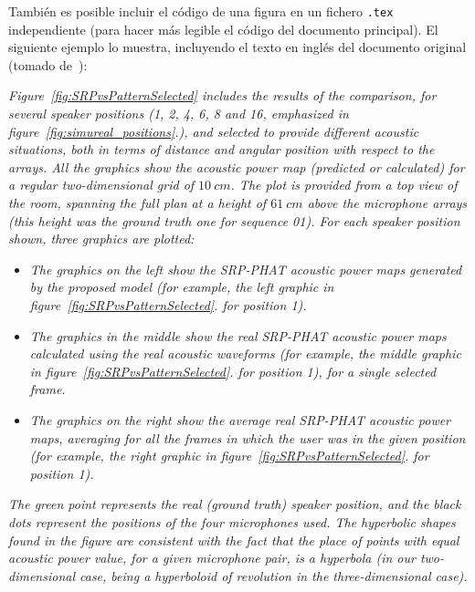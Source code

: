 También es posible incluir el código de una figura en un fichero \texttt{.tex} independiente (para hacer más legible el código del documento principal). El siguiente ejemplo lo muestra, incluyendo el texto en inglés del documento original (tomado de~\cite{velasco2016generative}):

\emph{Figure~\ref{fig:SRPvsPatternSelected} includes the results of the comparison, for several speaker positions (1, 2, 4, 6, 8 and 16, emphasized in figure~\ref{fig:simureal_positions}.), and selected to provide different acoustic situations, both in terms of distance and angular position with respect to the arrays. All the graphics show the acoustic power map (predicted or calculated) for a regular two-dimensional grid of $10~cm$. The plot is provided from a top view of the room, spanning the full plan at a height of $61~cm$ above the microphone arrays (this height was the ground truth one for sequence 01). For each speaker position shown, three graphics are plotted:}

\begin{itemize}
  \item \emph{The graphics on the left show the SRP-PHAT acoustic power maps generated by the proposed model (for example, the left graphic in figure~\ref{fig:SRPvsPatternSelected}. for position 1).}
  \item \emph{The graphics in the middle show the real SRP-PHAT acoustic power maps calculated using the real acoustic waveforms (for example, the middle graphic in figure~\ref{fig:SRPvsPatternSelected}. for position 1), for a single selected frame.}
  \item \emph{The graphics on the right show the average real SRP-PHAT acoustic power maps, averaging for all the frames in which the user was in the given position (for example, the right graphic in figure~\ref{fig:SRPvsPatternSelected}. for position 1).}
\end{itemize}

\emph{The green point represents the real (ground truth) speaker position, and the black dots represent the positions of the four microphones used. The hyperbolic shapes found in the figure are consistent with the fact that the place of points with equal acoustic power value, for a given microphone pair, is a hyperbola (in our two-dimensional case, being a hyperboloid of revolution in the three-dimensional case).}

